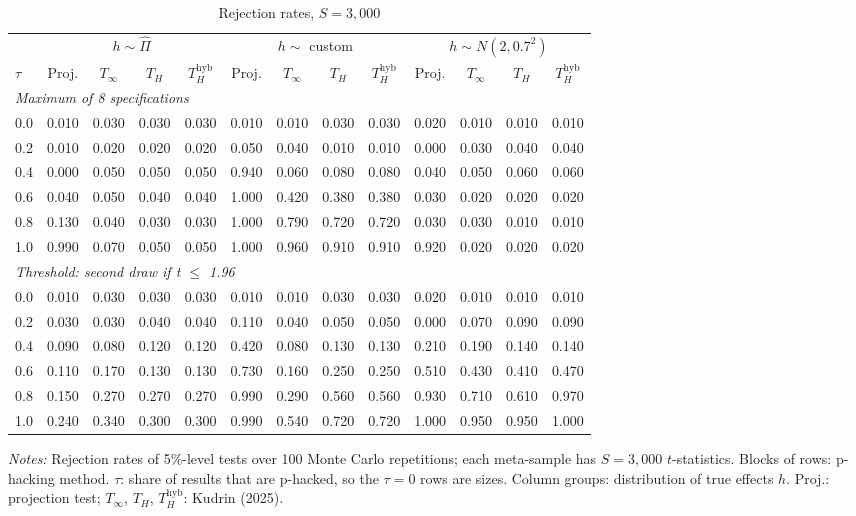 \begin{table}[htbp]
\centering
\caption{Rejection rates, $S = 3{,}000$}
\label{tab:kudrin_style_var_dial_plus_gammahat_S3000}
\footnotesize
\setlength{\tabcolsep}{4pt}
\begin{tabular}{lcccccccccccc}
\toprule
 & \multicolumn{4}{c}{$h \sim \hat{\Pi}$} & \multicolumn{4}{c}{$h \sim$ custom} & \multicolumn{4}{c}{$h \sim N(2, 0.7^2)$} \\
\cmidrule(lr){2-5} \cmidrule(lr){6-9} \cmidrule(lr){10-13}
$\tau$ & Proj. & $T_\infty$ & $T_H$ & $T_H^{\mathrm{hyb}}$ & Proj. & $T_\infty$ & $T_H$ & $T_H^{\mathrm{hyb}}$ & Proj. & $T_\infty$ & $T_H$ & $T_H^{\mathrm{hyb}}$ \\
\midrule
\multicolumn{13}{l}{\textit{Maximum of 8 specifications}} \\
0.0 & 0.010 & 0.030 & 0.030 & 0.030 & 0.010 & 0.010 & 0.030 & 0.030 & 0.020 & 0.010 & 0.010 & 0.010 \\
0.2 & 0.010 & 0.020 & 0.020 & 0.020 & 0.050 & 0.040 & 0.010 & 0.010 & 0.000 & 0.030 & 0.040 & 0.040 \\
0.4 & 0.000 & 0.050 & 0.050 & 0.050 & 0.940 & 0.060 & 0.080 & 0.080 & 0.040 & 0.050 & 0.060 & 0.060 \\
0.6 & 0.040 & 0.050 & 0.040 & 0.040 & 1.000 & 0.420 & 0.380 & 0.380 & 0.030 & 0.020 & 0.020 & 0.020 \\
0.8 & 0.130 & 0.040 & 0.030 & 0.030 & 1.000 & 0.790 & 0.720 & 0.720 & 0.030 & 0.030 & 0.010 & 0.010 \\
1.0 & 0.990 & 0.070 & 0.050 & 0.050 & 1.000 & 0.960 & 0.910 & 0.910 & 0.920 & 0.020 & 0.020 & 0.020 \\
\midrule
\multicolumn{13}{l}{\textit{Threshold: second draw if t $\le$ 1.96}} \\
0.0 & 0.010 & 0.030 & 0.030 & 0.030 & 0.010 & 0.010 & 0.030 & 0.030 & 0.020 & 0.010 & 0.010 & 0.010 \\
0.2 & 0.030 & 0.030 & 0.040 & 0.040 & 0.110 & 0.040 & 0.050 & 0.050 & 0.000 & 0.070 & 0.090 & 0.090 \\
0.4 & 0.090 & 0.080 & 0.120 & 0.120 & 0.420 & 0.080 & 0.130 & 0.130 & 0.210 & 0.190 & 0.140 & 0.140 \\
0.6 & 0.110 & 0.170 & 0.130 & 0.130 & 0.730 & 0.160 & 0.250 & 0.250 & 0.510 & 0.430 & 0.410 & 0.470 \\
0.8 & 0.150 & 0.270 & 0.270 & 0.270 & 0.990 & 0.290 & 0.560 & 0.560 & 0.930 & 0.710 & 0.610 & 0.970 \\
1.0 & 0.240 & 0.340 & 0.300 & 0.300 & 0.990 & 0.540 & 0.720 & 0.720 & 1.000 & 0.950 & 0.950 & 1.000 \\
\bottomrule
\end{tabular}
\par\smallskip
\begin{minipage}{\linewidth}\footnotesize\textit{Notes:} Rejection rates of 5\%-level tests over 100 Monte Carlo repetitions; each meta-sample has $S = 3{,}000$ $t$-statistics. Blocks of rows: p-hacking method. $\tau$: share of results that are p-hacked, so the $\tau = 0$ rows are sizes. Column groups: distribution of true effects $h$. Proj.: projection test; $T_\infty$, $T_H$, $T_H^{\mathrm{hyb}}$: Kudrin (2025).\end{minipage}
\end{table}
